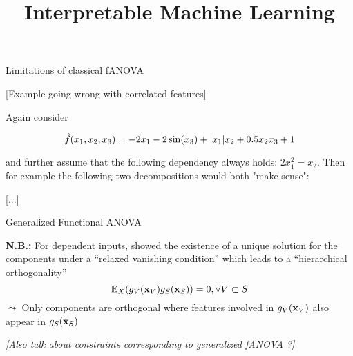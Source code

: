\documentclass[11pt,compress,t,notes=noshow, aspectratio=169, xcolor=table]{beamer}
\title{Interpretable Machine Learning}
\date{}
\begin{document}
\newcommand{\titlefigure}{figure/open_blackbox}
\newcommand{\learninggoals}{
\item Limitations of classical fANOVA
\item Overcoming these limitations with generalized fANOVA
\item How ALE Plots can be used as another, different approach to obtain functional decompositions
\item Sobol-Hoeffding decomposition ??}


\begin{frame}{Limitations of classical fANOVA}

    [Example going wrong with correlated features]

    \begin{example}

        Again consider

        \begin{equation*}
            \hat{f}(x_1, x_2, x_3) = - 2x_1 - 2\sin(x_3) + |x_1|x_2 + 0.5 x_2 x_3 +1
        \end{equation*}

        and further assume that the following dependency always holds: \(2x_1^2 = x_2\). Then for example the following two decompositions would both "make sense":
        
    \end{example}

    [...]

    
    
\end{frame}

\begin{frame}{Generalized Functional ANOVA}

    \textbf{N.B.:} For dependent inputs,  showed the existence of a unique solution for the components under a ``relaxed vanishing condition'' which leads to a ``hierarchical orthogonality''
    $$\mathbb{E}_{X} (g_{V}(\mathbf{x}_V) g_{S}(\mathbf{x}_S)) = 0, \forall V \subset S$$
    $\leadsto$ Only components are orthogonal where features involved in $g_{V}(\mathbf{x}_V)$ also appear in $g_{S}(\mathbf{x}_S)$

    \pause

    \textit{[Also talk about constraints corresponding to generalized fANOVA ?]}
    
\end{frame}
\end{document}
